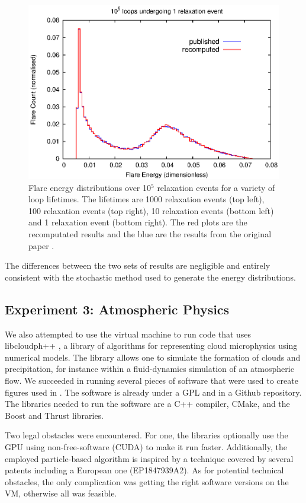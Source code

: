 \begin{figure}[h!]
  \includegraphics[scale=0.35]{../Group_3/wrpf_rx10e5_lle0.eps}
  \caption{\small{Flare energy distributions over 10$^5$ relaxation events for a variety of loop lifetimes. The lifetimes are 1000 relaxation events (top left), 100 relaxation events (top right), 10 relaxation events (bottom left) and 1 relaxation event (bottom right). The red plots are the recomputated results and the blue are the results from the original paper \cite{bareford2010nanoflare}.}}
  \label{fig_recomp_grp3_exp2}
  \vspace{-10pt} 
\end{figure}
The differences between the two sets of results are negligible and entirely consistent with the stochastic method used to generate the energy distributions.


 
\subsection*{Experiment 3: Atmospheric Physics}

We also attempted to use the virtual machine to run code that uses libcloudph++ \cite{arabas2013libcloud}, a library of algorithms
for representing cloud microphysics using numerical models. The library allows one to simulate the formation of clouds and precipitation, for instance within a fluid-dynamics simulation of an atmospheric flow. We succeeded in running several pieces of software that were used to create figures used in \cite{arabas2013libcloud}. The software is already under a GPL and in a Github repository. The libraries needed to run the software are a C++ compiler, CMake, and the Boost and Thrust libraries.

Two legal obstacles were encountered. For one, the libraries optionally use the GPU using non-free-software (CUDA) to make it run faster. Additionally, the employed particle-based algorithm is inspired by a technique covered by several patents including a European one (EP1847939A2). As for potential technical obstacles, the only complication was getting the right software versions on the VM, otherwise all was feasible.
